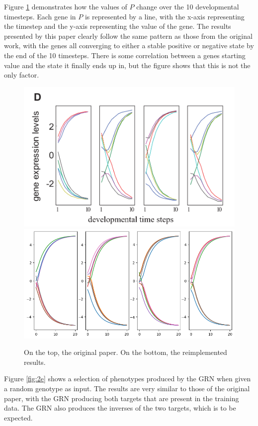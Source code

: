 \documentclass[twocolumn,a4paper]{article}
\begin{document}
    Figure \ref{fig:2d} demonstrates how the values of $P$ change over the 10 developmental timesteps. Each gene in $P$ is represented by a line, with the x-axis representing the timestep and the y-axis representing the value of the gene. The results presented by this paper clearly follow the same pattern as those from the original work, with the genes all converging to either a stable positive or negative state by the end of the 10 timesteps. There is some correlation between a genes starting value and the state it finally ends up in, but the figure shows that this is not the only factor.

    \begin{figure}[h]
        \centering
        \includegraphics[width=0.9\linewidth]{orig_img/fig2d.png}
        \includegraphics[width=0.9\linewidth]{img/fig2d.png}
        \caption{On the top, the original paper. On the bottom, the reimplemented results.} \label{fig:2d}
    \end{figure}

    Figure \ref{fig:2e} shows a selection of phenotypes produced by the GRN when given a random genotype as input. The results are very similar to those of the original paper, with the GRN producing both targets that are present in the training data. The GRN also produces the inverses of the two targets, which is to be expected.
\end{document}
